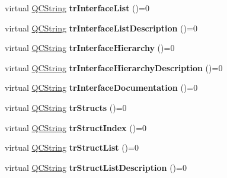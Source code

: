 \begin{DoxyCompactItemize}
\item 
\mbox{\label{class_translator_a40e9ed80f1f17f580386a6d9b74c7f95}} 
virtual \mbox{\hyperlink{class_q_c_string}{Q\+C\+String}} {\bfseries tr\+Interface\+List} ()=0
\item 
\mbox{\label{class_translator_ae3baa70ff9d1903db7eb2e366039531f}} 
virtual \mbox{\hyperlink{class_q_c_string}{Q\+C\+String}} {\bfseries tr\+Interface\+List\+Description} ()=0
\item 
\mbox{\label{class_translator_a7ede19a0a1691ea148511b6f8cdb587b}} 
virtual \mbox{\hyperlink{class_q_c_string}{Q\+C\+String}} {\bfseries tr\+Interface\+Hierarchy} ()=0
\item 
\mbox{\label{class_translator_a6c9a3d8c7e0fb143416c55e50ae71fdf}} 
virtual \mbox{\hyperlink{class_q_c_string}{Q\+C\+String}} {\bfseries tr\+Interface\+Hierarchy\+Description} ()=0
\item 
\mbox{\label{class_translator_af61f5090e507de90af4d0f5c6e3aae53}} 
virtual \mbox{\hyperlink{class_q_c_string}{Q\+C\+String}} {\bfseries tr\+Interface\+Documentation} ()=0
\item 
\mbox{\label{class_translator_a4723dccd65374bfd0aadab9f17535fd2}} 
virtual \mbox{\hyperlink{class_q_c_string}{Q\+C\+String}} {\bfseries tr\+Structs} ()=0
\item 
\mbox{\label{class_translator_ab7c5f07bdc45f9e481b10da2e02c15ff}} 
virtual \mbox{\hyperlink{class_q_c_string}{Q\+C\+String}} {\bfseries tr\+Struct\+Index} ()=0
\item 
\mbox{\label{class_translator_ad8a55c8d924f91c37fd2ccf1fbd8e64f}} 
virtual \mbox{\hyperlink{class_q_c_string}{Q\+C\+String}} {\bfseries tr\+Struct\+List} ()=0
\item 
\mbox{\label{class_translator_ad8db80bc9358def985c7b2fe269afb95}} 
virtual \mbox{\hyperlink{class_q_c_string}{Q\+C\+String}} {\bfseries tr\+Struct\+List\+Description} ()=0
\item 
\mbox{\label{class_translator_a6c5200bba1acd6c4cfa066a1fc2cba06}} 

\end{DoxyCompactItemize}
